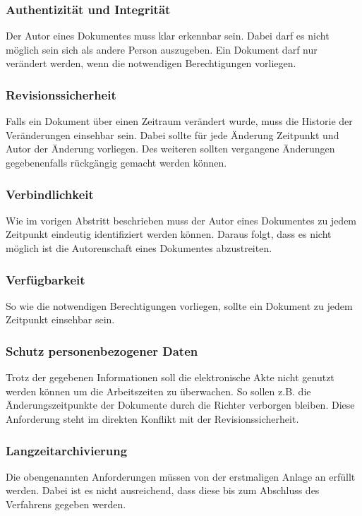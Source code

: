 \subsubsection*{Authentizität und Integrität}
Der Autor eines Dokumentes muss klar erkennbar sein. Dabei darf es nicht möglich sein sich als andere Person auszugeben. Ein Dokument darf nur verändert werden, wenn die notwendigen Berechtigungen vorliegen. 
\subsubsection*{Revisionssicherheit}
Falls ein Dokument über einen Zeitraum verändert wurde, muss die Historie der Veränderungen einsehbar sein. Dabei sollte für jede Änderung Zeitpunkt und Autor der Änderung vorliegen. Des weiteren sollten vergangene Änderungen gegebenenfalls rückgängig gemacht werden können.
\subsubsection*{Verbindlichkeit}
Wie im vorigen Abstritt beschrieben muss der Autor eines Dokumentes zu jedem Zeitpunkt eindeutig identifiziert werden können. Daraus folgt, dass es nicht möglich ist die Autorenschaft eines Dokumentes abzustreiten.
\subsubsection*{Verfügbarkeit}
So wie die notwendigen Berechtigungen vorliegen, sollte ein Dokument zu jedem Zeitpunkt einsehbar sein.
\subsubsection*{Schutz personenbezogener Daten}
Trotz der gegebenen Informationen soll die elektronische Akte nicht genutzt werden können um die Arbeitszeiten zu überwachen. So sollen z.B. die Änderungszeitpunkte der Dokumente durch die Richter verborgen bleiben. Diese Anforderung steht im direkten Konflikt mit der Revisionssicherheit.
\subsubsection*{Langzeitarchivierung}
Die obengenannten Anforderungen müssen von der erstmaligen Anlage an erfüllt werden. Dabei ist es nicht ausreichend, dass diese bis zum Abschluss des Verfahrens gegeben werden.


